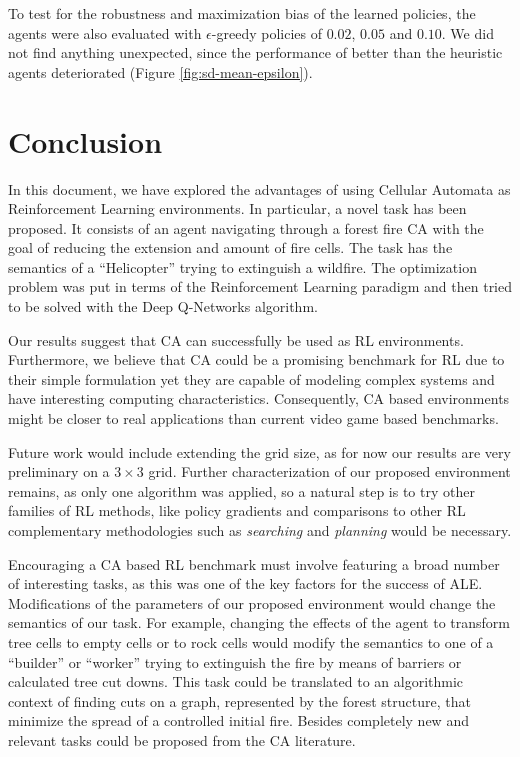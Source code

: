 \documentclass[
  12pt,
  openany]{book}
\begin{document}
To test for the robustness and maximization bias of the learned policies, the agents were also evaluated with \(\epsilon\)-greedy policies of \(0.02\), \(0.05\) and \(0.10\). We did not find anything unexpected, since the performance of better than the heuristic agents deteriorated (Figure \ref{fig:sd-mean-epsilon}).

\hypertarget{conclusion}{%
\chapter{Conclusion}\label{conclusion}}

In this document, we have explored the advantages of using Cellular Automata as Reinforcement Learning environments. In particular, a novel task has been proposed. It consists of an agent navigating through a forest fire CA with the goal of reducing the extension and amount of fire cells. The task has the semantics of a ``Helicopter'' trying to extinguish a wildfire. The optimization problem was put in terms of the Reinforcement Learning paradigm and then tried to be solved with the Deep Q-Networks algorithm.

Our results suggest that CA can successfully be used as RL environments. Furthermore, we believe that CA could be a promising benchmark for RL due to their simple formulation yet they are capable of modeling complex systems and have interesting computing characteristics. Consequently, CA based environments might be closer to real applications than current video game based benchmarks.

Future work would include extending the grid size, as for now our results are very preliminary on a \(3 \times 3\) grid. Further characterization of our proposed environment remains, as only one algorithm was applied, so a natural step is to try other families of RL methods, like policy gradients and comparisons to other RL complementary methodologies such as \emph{searching} and \emph{planning} would be necessary.

Encouraging a CA based RL benchmark must involve featuring a broad number of interesting tasks, as this was one of the key factors for the success of ALE. Modifications of the parameters of our proposed environment would change the semantics of our task. For example, changing the effects of the agent to transform tree cells to empty cells or to rock cells would modify the semantics to one of a ``builder'' or ``worker'' trying to extinguish the fire by means of barriers or calculated tree cut downs. This task could be translated to an algorithmic context of finding cuts on a graph, represented by the forest structure, that minimize the spread of a controlled initial fire. Besides completely new and relevant tasks could be proposed from the CA literature.
\end{document}
